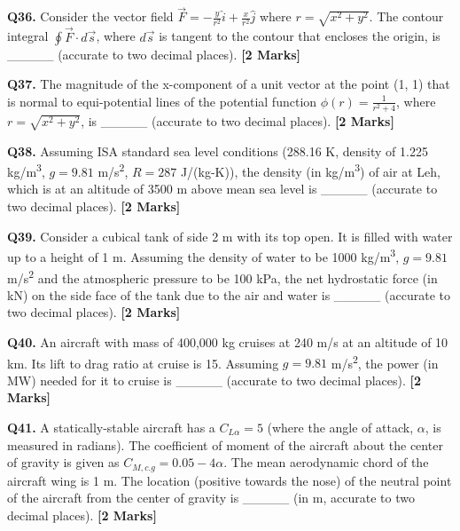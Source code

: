 \documentclass[11pt]{article}
\newcommand{\questionb}[2]{
    \noindent\textbf{Q#2.} #1 \hfill \textbf{[2 Marks]}
}
\begin{document}
\vspace{0.5cm}

\questionb{Consider the vector field $\vec{F} = -\frac{y}{r^2} \hat{i} + \frac{x}{r^2} \hat{j}$ where $r = \sqrt{x^2 + y^2}$. The contour integral $\oint \vec{F} \cdot d\vec{s}$, where $d\vec{s}$ is tangent to the contour that encloses the origin, is \_\_\_\_\_ (accurate to two decimal places).}{36}

\vspace{0.5cm}

\questionb{The magnitude of the x-component of a unit vector at the point (1, 1) that is normal to equi-potential lines of the potential function $\phi(r) = \frac{1}{r^2 + 4}$, where $r = \sqrt{x^2 + y^2}$, is \_\_\_\_\_ (accurate to two decimal places).}{37}

\vspace{0.5cm}

\questionb{Assuming ISA standard sea level conditions (288.16 K, density of 1.225 kg/m\textsuperscript{3}, $g = 9.81$ m/s\textsuperscript{2}, $R = 287$ J/(kg-K)), the density (in kg/m\textsuperscript{3}) of air at Leh, which is at an altitude of 3500 m above mean sea level is \_\_\_\_\_ (accurate to two decimal places).}{38}

\vspace{0.5cm}

\questionb{Consider a cubical tank of side 2 m with its top open. It is filled with water up to a height of 1 m. Assuming the density of water to be 1000 kg/m\textsuperscript{3}, $g = 9.81$ m/s\textsuperscript{2} and the atmospheric pressure to be 100 kPa, the net hydrostatic force (in kN) on the side face of the tank due to the air and water is \_\_\_\_\_ (accurate to two decimal places).}{39}

\vspace{0.5cm}

\questionb{An aircraft with mass of 400,000 kg cruises at 240 m/s at an altitude of 10 km. Its lift to drag ratio at cruise is 15. Assuming $g = 9.81$ m/s\textsuperscript{2}, the power (in MW) needed for it to cruise is \_\_\_\_\_ (accurate to two decimal places).}{40}

\vspace{0.5cm}

\questionb{A statically-stable aircraft has a $C_{L\alpha} = 5$ (where the angle of attack, $\alpha$, is measured in radians). The coefficient of moment of the aircraft about the center of gravity is given as $C_{M,c.g} = 0.05 - 4\alpha$. The mean aerodynamic chord of the aircraft wing is 1 m. The location (positive towards the nose) of the neutral point of the aircraft from the center of gravity is \_\_\_\_\_ (in m, accurate to two decimal places).}{41}
\end{document}
